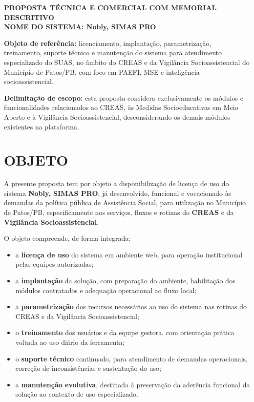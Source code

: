 \documentclass[12pt,a4paper]{article}
\begin{document}
\begin{center}
{\Large \textbf{PROPOSTA TÉCNICA E COMERCIAL COM MEMORIAL DESCRITIVO}}\\[1em]
\textbf{NOME DO SISTEMA: Nobly, SIMAS PRO}
\end{center}

\textbf{Objeto de referência:} licenciamento, implantação, parametrização, treinamento, suporte técnico e manutenção do sistema para atendimento especializado do SUAS, no âmbito do CREAS e da Vigilância Socioassistencial do Município de Patos/PB, com foco em PAEFI, MSE e inteligência socioassistencial.

\textbf{Delimitação de escopo:} esta proposta considera exclusivamente os módulos e funcionalidades relacionados ao CREAS, às Medidas Socioeducativas em Meio Aberto e à Vigilância Socioassistencial, desconsiderando os demais módulos existentes na plataforma.

\section{OBJETO}

A presente proposta tem por objeto a disponibilização de licença de uso do sistema \textbf{Nobly, SIMAS PRO}, já desenvolvido, funcional e vocacionado às demandas da política pública de Assistência Social, para utilização no Município de Patos/PB, especificamente nos serviços, fluxos e rotinas do \textbf{CREAS} e da \textbf{Vigilância Socioassistencial}.

O objeto compreende, de forma integrada:

\begin{itemize}[leftmargin=1.5cm]
\item a \textbf{licença de uso} do sistema em ambiente web, para operação institucional pelas equipes autorizadas;
\item a \textbf{implantação} da solução, com preparação do ambiente, habilitação dos módulos contratados e adequação operacional ao fluxo local;
\item a \textbf{parametrização} dos recursos necessários ao uso do sistema nas rotinas do CREAS e da Vigilância Socioassistencial;
\item o \textbf{treinamento} dos usuários e da equipe gestora, com orientação prática voltada ao uso diário da ferramenta;
\item o \textbf{suporte técnico} continuado, para atendimento de demandas operacionais, correção de inconsistências e sustentação do uso;
\item a \textbf{manutenção evolutiva}, destinada à preservação da aderência funcional da solução ao contexto de uso especializado.
\end{itemize}
\end{document}
